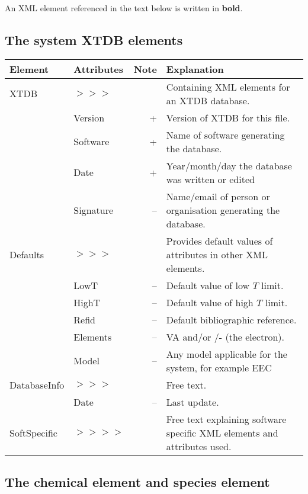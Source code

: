\documentclass{article}
\begin{document}
An XML element referenced in the text below is written in {\bf bold}.

\subsection{The system XTDB elements}

\bigskip
\begin{tabular}{|p{} p{} r p{}|}\hline
  Element & Attributes & Note & Explanation\\\hline

  XTDB    &$>>>$&& Containing XML elements for an XTDB database.\\
          & Version & + & Version of XTDB for this file.\\
          &Software & + & Name of software generating the database.\\
          &Date     & + & Year/month/day the database was written or edited\\
          &Signature& -- & Name/email of person or organisation generating the database.\\\hline
  
  Defaults &$>>>$&& Provides default values of attributes in other XML elements.\\
           & LowT & -- & Default value of low $T$ limit.\\
           & HighT & -- & Default value of high $T$ limit.\\
           & Refid & -- & Default bibliographic reference. \\
           & Elements & -- & VA and/or /- (the electron).\\
           & Model & -- & Any model applicable for the system, for example EEC\\\hline

  DatabaseInfo &$>>>$&& Free text.\\
  & Date & -- & Last update.\\\hline

  SoftSpecific &$>>>>$&& Free text explaining software specific XML
  elements and attributes used.\\\hline
  
\end{tabular}

\subsection{The chemical element and species element}
\end{document}
